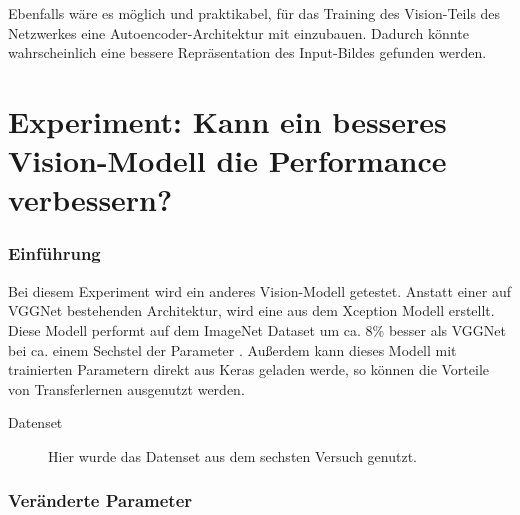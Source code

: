 \documentclass[pdftex,a4paper,halfparskip, article]{scrartcl}
\begin{document}
Ebenfalls wäre es möglich und praktikabel, für das Training des Vision-Teils des Netzwerkes eine Autoencoder-Architektur mit einzubauen. Dadurch könnte wahrscheinlich eine bessere Repräsentation des Input-Bildes gefunden werden.


\newpage

 

\appendix

\section{Experiment: Kann ein besseres Vision-Modell die Performance verbessern?}\label{sub:exception}

\subsubsection*{Einführung}

Bei diesem Experiment wird ein anderes Vision-Modell getestet. Anstatt einer auf VGGNet bestehenden Architektur, wird eine aus dem Xception \cite{DBLP:journals/corr/Chollet16a} Modell erstellt. Diese Modell performt auf dem ImageNet Dataset um ca. 8\% besser als VGGNet bei ca. einem Sechstel der Parameter \cite{kerasModels}. Außerdem kann dieses Modell mit trainierten Parametern direkt aus Keras geladen werde, so können die Vorteile von Transferlernen ausgenutzt werden. 

\begin{description}
	\item[Datenset] Hier wurde das Datenset aus dem sechsten Versuch genutzt.
\end{description}

\subsubsection*{Veränderte Parameter}
\end{document}
